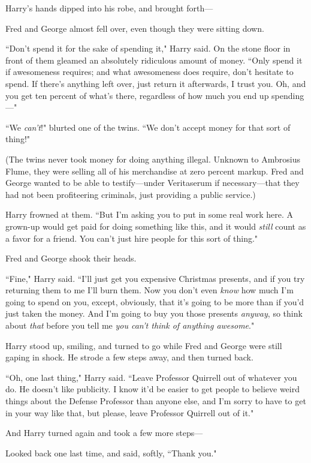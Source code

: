 Harry's hands dipped into his robe, and brought forth—

Fred and George almost fell over, even though they were sitting down.

``Don't spend it for the sake of spending it," Harry said. On the stone floor in front of them gleamed an absolutely ridiculous amount of money. ``Only spend it if awesomeness requires; and what awesomeness does require, don't hesitate to spend. If there's anything left over, just return it afterwards, I trust you. Oh, and you get ten percent of what's there, regardless of how much you end up spending—"

``We \emph{can't}!" blurted one of the twins. ``We don't accept money for that sort of thing!"

(The twins never took money for doing anything illegal. Unknown to Ambrosius Flume, they were selling all of his merchandise at zero percent markup. Fred and George wanted to be able to testify—under Veritaserum if necessary—that they had not been profiteering criminals, just providing a public service.)

Harry frowned at them. ``But I'm asking you to put in some real work here. A grown-up would get paid for doing something like this, and it would \emph{still} count as a favor for a friend. You can't just hire people for this sort of thing."

Fred and George shook their heads.

``Fine," Harry said. ``I'll just get you expensive Christmas presents, and if you try returning them to me I'll burn them. Now you don't even \emph{know} how much I'm going to spend on you, except, obviously, that it's going to be more than if you'd just taken the money. And I'm going to buy you those presents \emph{anyway}, so think about \emph{that} before you tell me \emph{you can't think of anything awesome}."

Harry stood up, smiling, and turned to go while Fred and George were still gaping in shock. He strode a few steps away, and then turned back.

``Oh, one last thing," Harry said. ``Leave Professor Quirrell out of whatever you do. He doesn't like publicity. I know it'd be easier to get people to believe weird things about the Defense Professor than anyone else, and I'm sorry to have to get in your way like that, but please, leave Professor Quirrell out of it."

And Harry turned again and took a few more steps—

Looked back one last time, and said, softly, ``Thank you."

